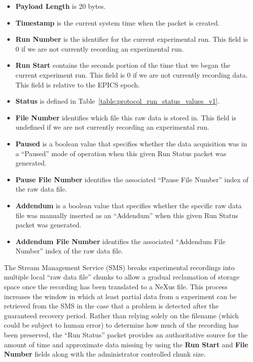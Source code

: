 \begin{itemize}
\item{\bf Payload Length} is 20 bytes.
\item{\bf Timestamp} is the current system time when the packet is created.
\item{\bf Run Number} is the identifier for the current experimental run. This
field is 0 if we are not currently recording an experimental run.
\item{\bf Run Start} contains the seconds portion of the time that we began
the current experiment run. This field is 0 if we are not currently recording
data. This field is relative to the EPICS epoch.
\item{\bf Status} is defined in
Table~\ref{table:protocol_run_status_values_v1}.
\item{\bf File Number} identifies which file this raw data is stored in.
This field is undefined if we are not currently recording an
experimental run.
\item{\bf Paused} is a boolean value that specifies whether the
data acquisition was in a ``Paused'' mode of operation when this
given Run Status packet was generated.
\item{\bf Pause File Number} identifies the associated ``Pause File
Number'' index of the raw data file.
\item{\bf Addendum} is a boolean value that specifies whether the
specific raw data file was manually inserted as an ``Addendum''
when this given Run Status packet was generated.
\item{\bf Addendum File Number} identifies the associated
``Addendum File Number'' index of the raw data file.
\end{itemize}

The Stream Management Service (SMS) breaks experimental recordings into multiple
local ``raw data file''
chunks to allow a gradual reclamation of storage space once the recording
has been translated to a NeXus file. This process increases the window in
which at least partial data from a experiment can be retrieved from the SMS
in the case that a problem is detected after the guaranteed recovery period.
Rather than relying solely on the filename (which could be subject to human
error) to determine how much of the recording has been preserved, the
``Run Status'' packet provides an authoritative source for the amount
of time and approximate data missing by using the {\bf Run Start} and
{\bf File Number} fields along with the administrator controlled chunk size.


